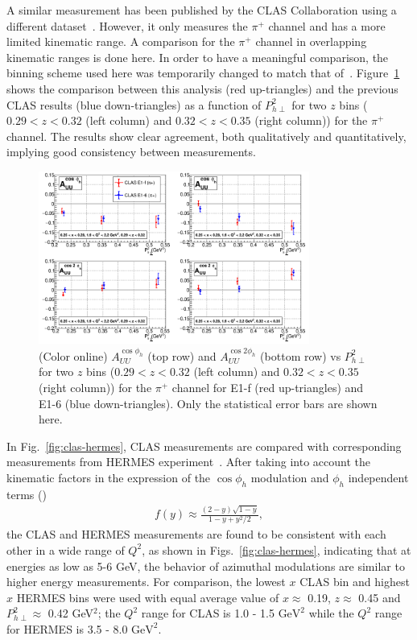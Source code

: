 \documentclass[aps,prl,twocolumn,showpacs,superscriptaddress,groupedaddress]{revtex4-1}  %
\newcommand{\Phperp}{P_{h\perp}}
\newcommand{\xbj}{x}
\begin{document}
A similar measurement has been published by the CLAS Collaboration using a different dataset~\cite{Osipenko:2008rv}.
However, it only measures the $\pi^+$ channel and has a more limited kinematic range.
A comparison for the $\pi^+$ channel in overlapping kinematic ranges is done here.
In order to have a meaningful comparison, the binning scheme used here was temporarily changed to match that of~\cite{Osipenko:2008rv}.
Figure~\ref{fig:osipenkoComparisonVPT2_2zBins} shows the comparison between this analysis (red up-triangles) and the previous CLAS results (blue down-triangles) as a function of $\Phperp^2$ for two $z$ bins ($0.29 < z < 0.32$ (left column) and $0.32 < z < 0.35$ (right column)) for the $\pi^+$ channel.
The results show clear agreement, both qualitatively and quantitatively, implying good consistency between measurements.
%
\begin{figure}[htp]
\centering
\includegraphics[width=3.5in]{plots/osipenkoComparisonVPT2_2zBins.png}
\caption{(Color online) $A_{UU}^{\cos \phi_h}$ (top row) and $A_{UU}^{\cos 2\phi_h}$ (bottom row) vs $P_{h\perp}^2$ for two $z$ bins ($0.29 < z < 0.32$ (left column) and $0.32 < z < 0.35$ (right column)) for the $\pi^+$ channel for E1-f (red up-triangles) and E1-6 (blue down-triangles). Only the statistical error bars are shown here.}
\label{fig:osipenkoComparisonVPT2_2zBins}
\end{figure}

In Fig.~\ref{fig:clas-hermes}, CLAS measurements are compared with corresponding measurements from HERMES experiment~\cite{Airapetian:2012yg}.
After taking into account the kinematic factors in the expression
of the $\cos\phi_h$ modulation and $\phi_h$ independent terms (\cite{Bacchetta:2006tn})
\begin{eqnarray}
f(y)\approx \frac{(2-y)\sqrt{1-y}}{1-y+y^{2}/2} ,
\label{fy}
\end{eqnarray}
the CLAS and HERMES measurements are found to 
be consistent with each other in a wide range of $Q^2$, as shown in Figs.~\ref{fig:clas-hermes}, indicating that at energies as low as 5-6 GeV, the
behavior of azimuthal modulations are similar to higher energy measurements. 
For comparison, the lowest $\xbj$ CLAS bin and highest $\xbj$ HERMES bins were used with equal average value of $\xbj\approx$ 0.19, $z\approx$ 0.45 and $\Phperp^2 \approx$ 0.42 GeV$^2$;
the $Q^2$ range for CLAS is 1.0 - 1.5 $\text{GeV}^2$ while the $Q^2$ range for HERMES is 3.5 - 8.0 $\text{GeV}^2$.
\end{document}
